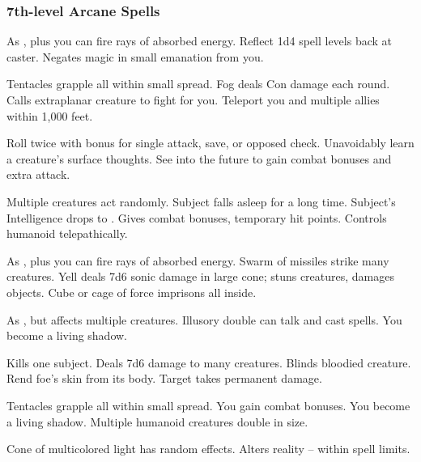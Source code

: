 \subsubsection{7th-level Arcane Spells}
\begin{swspelllist}
   As , plus you can fire rays of absorbed energy.
   Reflect 1d4 spell levels back at caster.
   Negates magic in small emanation from you.

   Tentacles grapple all within small spread.
   Fog deals Con damage each round.
   Calls extraplanar creature to fight for you.
   Teleport you and multiple allies within 1,000 feet.

   Roll twice with bonus for single attack, save, or opposed check.
   Unavoidably learn a creature's surface thoughts.
   See into the future to gain combat bonuses and extra attack.

   Multiple creatures act randomly.
   Subject falls asleep for a long time.
   Subject's Intelligence drops to .
   Gives combat bonuses, temporary hit points.
   Controls humanoid telepathically.

   As , plus you can fire rays of absorbed energy.
   Swarm of missiles strike many creatures.
   Yell deals 7d6 sonic damage in large cone; stuns creatures, damages objects.
  \M Cube or cage of force imprisons all inside.

   As , but affects multiple creatures.
   Illusory double can talk and cast spells.
   You become a living shadow.
  \spellheadrestricted{}

   Kills one subject.
   Deals 7d6 damage to many creatures.
   Blinds bloodied creature.
   Rend foe's skin from its body.
   Target takes permanent damage.

   Tentacles grapple all within small spread.
  \M You gain combat bonuses.
   You become a living shadow.
   Multiple humanoid creatures double in size.

   Cone of multicolored light has random effects.
  \M Alters reality -- within spell limits.
\end{swspelllist}


